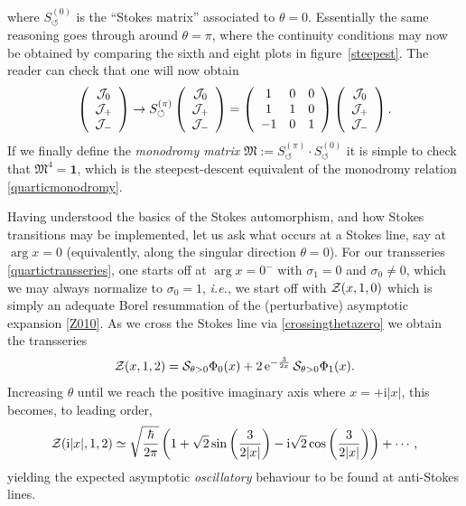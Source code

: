 \documentclass[11pt,a4paper]{article}
\newcommand{\CJ}{{\cal J}}
\newcommand{\CS}{{\cal S}}
\newcommand{\CZ}{{\cal Z}}
\newcommand{\be}{\begin{equation}}
\newcommand{\ee}{\end{equation}}
\newcommand{\rme}{{\mathrm{e}}}
\newcommand{\rmi}{{\mathrm{i}}}
\begin{document}
%
\noindent
where $S_{\circlearrowleft}^{(0)}$ is the ``Stokes matrix'' associated to $\theta=0$. Essentially the same reasoning goes through around $\theta=\pi$, where the continuity conditions may now be obtained by comparing the sixth and eight plots in figure~\ref{steepest}. The reader can check that one will now obtain
%
\begin{equation}
\left(
\begin{array}{ccc}
\CJ_0 \\
\CJ_+ \\
\CJ_-
\end{array}
\right) \to S_{\circlearrowleft}^{(\pi)} \left(
\begin{array}{ccc}
\CJ_0 \\
\CJ_+ \\
\CJ_-
\end{array}
\right) = \left(
\begin{array}{ccc}
 1 & 0 & 0 \\
 1 & 1 & 0 \\
-1 & 0 & 1
\end{array}
\right) \left(
\begin{array}{ccc} 
\CJ_0 \\
\CJ_+ \\
\CJ_-
\end{array}
\right).
\end{equation}
%
\noindent
If we finally define the \textit{monodromy matrix} $\mathfrak{M} := S_{\circlearrowleft}^{(\pi)} \cdot S_{\circlearrowleft}^{(0)}$ it is simple to check that $\mathfrak{M}^4 = \boldsymbol{1}$, which is the steepest-descent equivalent of the monodromy relation \eqref{quarticmonodromy}.

Having understood the basics of the Stokes automorphism, and how Stokes transitions may be implemented, let us ask what occurs at a Stokes line, say at $\arg x = 0$ (equivalently, along the singular direction $\theta = 0$). For our transseries \eqref{quartictransseries}, one starts off at $\arg x = 0^-$ with $\sigma_1 = 0$ and $\sigma_0 \not = 0$, which we may always normalize to $\sigma_0=1$, \textit{i.e.}, we start off with $\CZ (x, 1, 0)$ which is simply an adequate Borel resummation of the (perturbative) asymptotic expansion \eqref{Z010}. As we cross the Stokes line via \eqref{crossingthetazero} we obtain the transseries
%
\be
\CZ (x, 1, 2) = \CS_{\theta>0} \Phi_0 (x) + 2\, \rme^{-\frac{3}{2x}}\, \CS_{\theta>0} \Phi_{1} (x).
\ee
%
\noindent
Increasing $\theta$ until we reach the positive imaginary axis where $x = + \rmi |x|$, this becomes, to leading order,
%
\be
\CZ (\rmi |x|, 1, 2) \simeq \sqrt{\frac{\hbar}{2\pi}} \left( 1 + \sqrt{2} \sin \left( \frac{3}{2 |x|} \right) - \rmi \sqrt{2} \cos \left( \frac{3}{2 |x|} \right) \right) + \cdots,
\ee
%
\noindent
yielding the expected asymptotic \textit{oscillatory} behaviour to be found at anti-Stokes lines.
\end{document}
